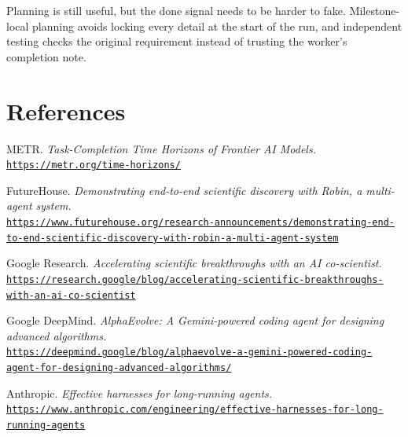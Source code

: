 \documentclass[11pt,a4paper]{article}
\renewcommand{\labelitemi}{\textcolor{accent}{\textbullet}}
\begin{document}
Planning is still useful, but the done signal needs to be harder to fake. Milestone-local planning avoids locking every detail at the start of the run, and independent testing checks the original requirement instead of trusting the worker's completion note.

\clearpage
\section{References}

\begingroup
\setlength{\parskip}{6pt}\small
\renewcommand{\labelitemi}{[\arabic{enumi}]}
\begin{enumerate}[leftmargin=2.0em,label={[\arabic*]}]
  \item METR. \emph{Task-Completion Time Horizons of Frontier AI Models.}\\
    \href{https://metr.org/time-horizons/}{\nolinkurl{https://metr.org/time-horizons/}}

  \item FutureHouse. \emph{Demonstrating end-to-end scientific discovery with Robin, a multi-agent system.}\\
    \href{https://www.futurehouse.org/research-announcements/demonstrating-end-to-end-scientific-discovery-with-robin-a-multi-agent-system}{\nolinkurl{https://www.futurehouse.org/research-announcements/demonstrating-end-to-end-scientific-discovery-with-robin-a-multi-agent-system}}

  \item Google Research. \emph{Accelerating scientific breakthroughs with an AI co-scientist.}\\
    \href{https://research.google/blog/accelerating-scientific-breakthroughs-with-an-ai-co-scientist}{\nolinkurl{https://research.google/blog/accelerating-scientific-breakthroughs-with-an-ai-co-scientist}}

  \item Google DeepMind. \emph{AlphaEvolve: A Gemini-powered coding agent for designing advanced algorithms.}\\
    \href{https://deepmind.google/blog/alphaevolve-a-gemini-powered-coding-agent-for-designing-advanced-algorithms/}{\nolinkurl{https://deepmind.google/blog/alphaevolve-a-gemini-powered-coding-agent-for-designing-advanced-algorithms/}}

  \item Anthropic. \emph{Effective harnesses for long-running agents.}\\
    \href{https://www.anthropic.com/engineering/effective-harnesses-for-long-running-agents}{\nolinkurl{https://www.anthropic.com/engineering/effective-harnesses-for-long-running-agents}}


\end{enumerate}
\end{document}
